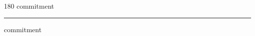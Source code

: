 
\begin{frame}
\begin{center}
\begin{turn}{180}
{\fontsize{2.5cm}{1em}\selectfont commitment}
\end{turn}
\vspace{1em}\par  
\hrule
\vspace{1em}\par  
{\fontsize{2.5cm}{1em}\selectfont commitment}
\end{center}
\end{frame}
